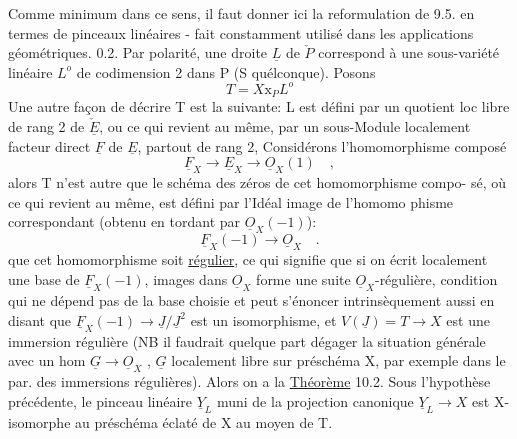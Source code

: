 
Comme minimum dans ce sens, il faut  donner ici la reformulation de 9.5.
en termes de pinceaux linéaires  -  fait constamment utilisé dans les
applications géométriques.
0.2.  Par polarité, une droite $\underline{L}$  de $\check{P}$  correspond à une sous-variété
linéaire $L^{o}$ de codimension 2 dans P  (S quélconque).  Posons
\[ T = X\mathrm{x}_{P}L^{o} \]
Une autre façon  de décrire T est la suivante:  L  est défini par un
quotient loc libre de rang 2 de $\check{\underline{E}}$, ou ce qui revient au même, par un
sous-Module localement facteur direct  $\underline{F}$ de $\underline{E}$, partout de rang 2,
Considérons  l'homomorphisme composé
\[ \underline{F}_{X} \longrightarrow \underline{E}_{X} \longrightarrow \underline{O}_{X}(1) \quad , \]
alors  T n'est autre que  le schéma des zéros de cet homomorphisme compo-%
sé, où ce qui revient au même, est défini par l'Idéal  image de l'homomo%
phisme correspondant (obtenu en tordant par $\underline{O}_{X}(-1)$):
\[ \underline{F}_{X}(-1) \longrightarrow \underline{O}_{X} \quad . \]
 que cet homomorphisme soit \uline{régulier}, ce qui signifie
que  si on écrit localement une base  de $\underline{F}_{X}(-1)$,   images dans $\underline{O}_{X}$\hand{\unsure{\^{}}}
forme une suite $\underline{O}_{X}$-régulière, condition qui ne dépend pas de la base
choisie et peut s'énoncer intrinsèquement aussi en disant que
$\underline{F}_{X}(-1)$$\to \underline{J}/\underline{J}^{2}$  est un isomorphisme, et  $V(\underline{J})=T \longrightarrow X$  est  une immersion
\margin{|} régulière  (NB il  faudrait quelque part dégager la situation
\margin{|} générale avec un hom  $\underline{G} \to \underline{O}_{X}$ , $\underline{G}$ localement libre sur préschéma X, par
\margin{|} exemple dans le par. des immersions régulières).  Alors on a la
 \uline{Théorème}  10.2.   Sous l'hypothèse précédente, le pinceau
linéaire $\underline{Y}_{L}$  muni de la projection canonique $\underline{Y}_{L} \longrightarrow X$  est  X-isomorphe
 au préschéma éclaté  de X au moyen de T.

